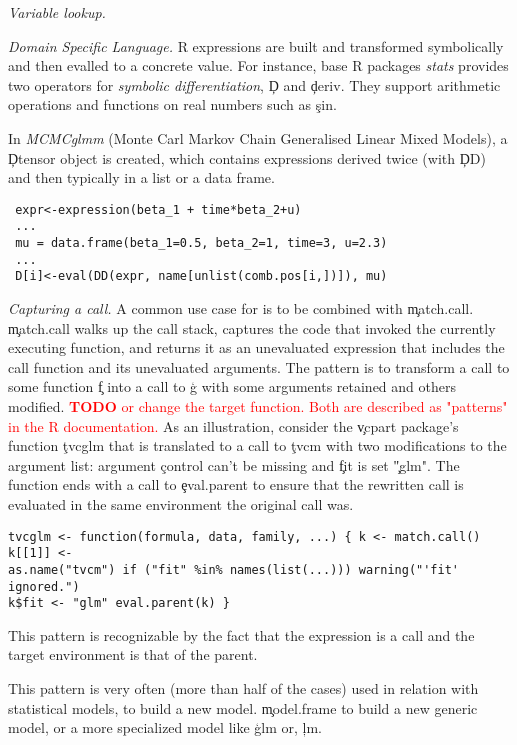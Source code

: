 \documentclass[review,nonacm,screen,acmsmall,anonymous=true]{acmart}
\newcommand{\mypara}[1]{\medskip\noindent\emph{#1}\xspace}
\newcommand{\authorcomment}[3]{\xspace\textcolor{#1}{{\bf #2} #3}\xspace}
\newcommand{\todo}[1]{\authorcomment{red}{TODO}{#1}}
\begin{document}
\mypara{Variable lookup.} %

\mypara{Domain Specific Language.} R expressions are built and transformed symbolically and then evalled to a concrete value. For instance,   base R packages \emph{stats} provides two operators for \emph{symbolic differentiation}, \c{D} and \c{deriv}. They support arithmetic operations and functions on real numbers such as \c{sin}. 

In \emph{MCMCglmm} (Monte Carl Markov Chain Generalised Linear Mixed Models), a \c{Dtensor} object is created, which contains expressions derived twice (with \c{DD}) and then typically in a list or a data frame.
\begin{lstlisting}
 expr<-expression(beta_1 + time*beta_2+u)
 ...
 mu = data.frame(beta_1=0.5, beta_2=1, time=3, u=2.3)
 ...
 D[i]<-eval(DD(expr, name[unlist(comb.pos[i,])]), mu)
\end{lstlisting}



\mypara{Capturing a call.}  A common use case for \eval is to be combined with \c{match.call}.
\c{match.call} walks up the call stack, captures the code that invoked the
currently executing function, and returns it as an unevaluated expression that includes the call function and its unevaluated arguments. The
pattern is to transform a call to some function \c{f} into a call to \c{g} with
some arguments retained and others modified.  \todo{or change the target
function. Both are described as "patterns" in the R documentation.} As an
illustration, consider the \c{vcpart} package's function \c{tvcglm} that is
translated to a call to \c{tvcm} with two modifications to the argument list:
argument \c{control} can't be missing and \c{fit} is set \c{"glm"}. The
function ends with a call to \c{eval.parent} to ensure that the rewritten call
is evaluated in the same environment the original call was.  \begin{lstlisting}
tvcglm <- function(formula, data, family, ...) { k <- match.call() k[[1]] <-
as.name("tvcm") if ("fit" %in% names(list(...))) warning("'fit' ignored.")
k$fit <- "glm" eval.parent(k) } \end{lstlisting} This pattern is recognizable
by the fact that the expression is a call and the target environment is that of
the parent.

This pattern is very often (more than half of the cases) used in relation with statistical models, to build a new model. \c{model.frame} to build a new generic model, or a more specialized model like \c{glm} or, \c{lm}.
\end{document}
